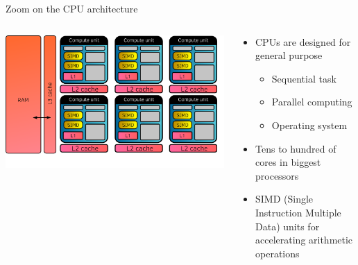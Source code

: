 \documentclass[aspectratio=169]{beamer}
\begin{document}
\begin{frame}{Zoom on the CPU architecture}
    \begin{columns}
        \begin{column}{0.5\linewidth}
            \begin{center}
                \includegraphics[width=\linewidth]{cpu_architecture.png}
            \end{center}
        \end{column}
        \begin{column}{0.5\linewidth}
            \begin{itemize}
                \item CPUs are designed for general purpose
                \begin{itemize}
                    \item Sequential task
                    \item Parallel computing
                    \item Operating system
                \end{itemize}
                \item Tens to hundred of cores in biggest processors
                \item SIMD (Single Instruction Multiple Data) units for accelerating arithmetic operations
            \end{itemize}
        \end{column}
    \end{columns}
\end{frame}

\end{document}
